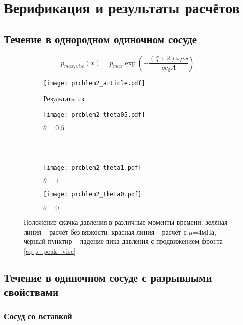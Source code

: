 \section{Верификация и результаты расчётов}


\subsection{Течение в однородном одиночном сосуде}

\begin{equation}
\label{eq:p_peak_visc}
p_{max, visc}(x) = p_{max} \exp\left(-\frac{(\zeta + 2)\pi \mu x}{\rho c_0 A}\right)
\end{equation}

\begin{figure}[h!]
\begin{subfigure}{0.5\linewidth}\centering
\texttt{[image: problem2\_article.pdf]}
\caption{Результаты из~\cite{boileau:2015}}\label{fig:prob2_a}
\end{subfigure}%
\begin{subfigure}{0.5\linewidth}\centering
\texttt{[image: problem2\_theta05.pdf]}
\caption{$\theta=0.5$}\label{fig:prob2_b}
\end{subfigure} \\
\hfill \\
\begin{subfigure}{0.5\linewidth}\centering
\texttt{[image: problem2\_theta1.pdf]}
\caption{$\theta=1$}\label{fig:prob2_c}
\end{subfigure}%
\begin{subfigure}{0.5\linewidth}\centering
\texttt{[image: problem2\_theta0.pdf]}
\caption{$\theta=0$}\label{fig:prob2_d}
\end{subfigure}%
\caption{Положение скачка давления в различные моменты времени: зелёная линия -- расчёт без вязкости, красная линия -- расчёт с $\mu$=4мПа,
чёрный пунктир -- падение пика давления с продвижением фронта \cref{eq:p_peak_visc}}\label{fig:prob2}
\end{figure}


\subsection{Течение в одиночном сосуде с разрывными свойствами}
\subsubsection{Сосуд со вставкой}

